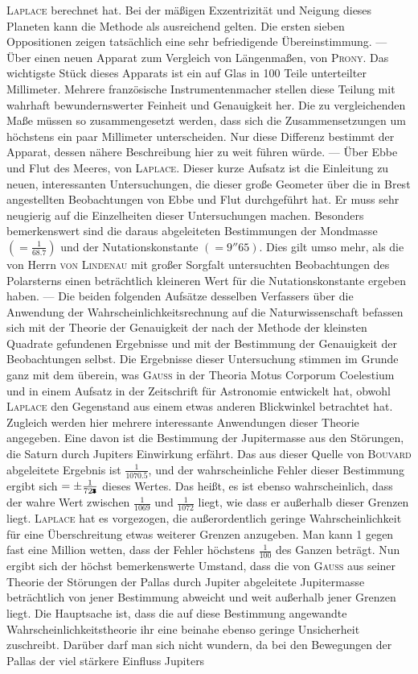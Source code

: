 \textsc{Laplace} berechnet hat. Bei der mäßigen Exzentrizität und Neigung dieses Planeten kann die Methode als ausreichend gelten. Die ersten sieben Oppositionen zeigen tatsächlich eine sehr befriedigende Übereinstimmung. --- Über einen neuen Apparat zum Vergleich von Längenmaßen, von \textsc{Prony}. Das wichtigste Stück dieses Apparats ist ein auf Glas in 100 Teile unterteilter Millimeter. Mehrere französische Instrumentenmacher stellen diese Teilung mit wahrhaft bewundernswerter Feinheit und Genauigkeit her. Die zu vergleichenden Maße müssen so zusammengesetzt werden, dass sich die Zusammensetzungen um höchstens ein paar Millimeter unterscheiden. Nur diese Differenz bestimmt der Apparat, dessen nähere Beschreibung hier zu weit führen würde. --- Über Ebbe und Flut des Meeres, von \textsc{Laplace}. Dieser kurze Aufsatz ist die Einleitung zu neuen, interessanten Untersuchungen, die dieser große Geometer über die in Brest angestellten Beobachtungen von Ebbe und Flut durchgeführt hat. Er muss sehr neugierig auf die Einzelheiten dieser Untersuchungen machen. Besonders bemerkenswert sind die daraus abgeleiteten Bestimmungen der Mondmasse $(= \frac{1}{68.7})$ und der Nutationskonstante $(= 9''65)$. Dies gilt umso mehr, als die von Herrn \textsc{von Lindenau} mit großer Sorgfalt untersuchten Beobachtungen des Polarsterns einen beträchtlich kleineren Wert für die Nutationskonstante ergeben haben. --- Die beiden folgenden Aufsätze desselben Verfassers über die Anwendung der Wahrscheinlichkeitsrechnung auf die Naturwissenschaft befassen sich mit der Theorie der Genauigkeit der nach der Methode der kleinsten Quadrate gefundenen Ergebnisse und mit der Bestimmung der Genauigkeit der Beobachtungen selbst. Die Ergebnisse dieser Untersuchung stimmen im Grunde ganz mit dem überein, was \textsc{Gauß} in der Theoria Motus Corporum Coelestium und in einem Aufsatz in der Zeitschrift für Astronomie entwickelt hat, obwohl \textsc{Laplace} den Gegenstand aus einem etwas anderen Blickwinkel betrachtet hat. Zugleich werden hier mehrere interessante Anwendungen dieser Theorie angegeben. Eine davon ist die Bestimmung der Jupitermasse aus den Störungen, die Saturn durch Jupiters Einwirkung erfährt. Das aus dieser Quelle von \textsc{Bouvard} abgeleitete Ergebnis ist $\frac{1}{1070.5}$, und der wahrscheinliche Fehler dieser Bestimmung ergibt sich $= \pm \frac{1}{72\ObservedJupiterErrorMark}$ dieses Wertes. Das heißt, es ist ebenso wahrscheinlich, dass der wahre Wert zwischen $\frac{1}{1069}$ und $\frac{1}{1072}$ liegt, wie dass er außerhalb dieser Grenzen liegt. \textsc{Laplace} hat es vorgezogen, die außerordentlich geringe Wahrscheinlichkeit für eine Überschreitung etwas weiterer Grenzen anzugeben. Man kann 1 gegen fast eine Million wetten, dass der Fehler höchstens $\frac{1}{100}$ des Ganzen beträgt. Nun ergibt sich der höchst bemerkenswerte Umstand, dass die von \textsc{Gauß} aus seiner Theorie der Störungen der Pallas durch Jupiter abgeleitete Jupitermasse beträchtlich von jener Bestimmung abweicht und weit außerhalb jener Grenzen liegt. Die Hauptsache ist, dass die auf diese Bestimmung angewandte Wahrscheinlichkeitstheorie ihr eine beinahe ebenso geringe Unsicherheit zuschreibt. Darüber darf man sich nicht wundern, da bei den Bewegungen der Pallas der viel stärkere Einfluss Jupiters 
